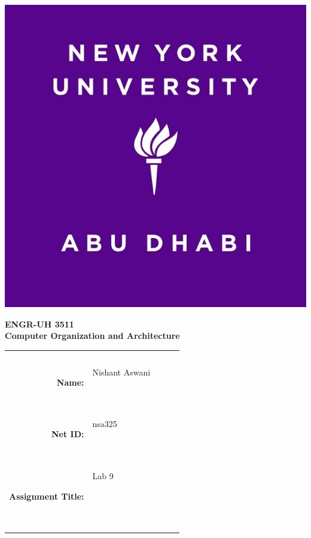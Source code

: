 \documentclass[twocolumn]{article}
\title{\myassignmenttitle}
\author{\myname, \myemail}
\affil{\myclassname (\mycoursenumber), Instructor \myinstructor}
\date{}
\newcommand{\myname}{Nishant Aswani}
\newcommand{\mynetid}{nsa325}
\newcommand{\myhwtype}{Lab }
\newcommand{\myhwnum}{9}
\newcommand{\mycoursenumber}{ENGR-UH 3511}
\newcommand{\myclassname}{Computer Organization and Architecture}
\begin{document}
\onecolumn
\pagestyle{fancy}
\fancyhf{}
\renewcommand{\headrulewidth}{0pt}

\begin{center}
  \includegraphics[scale=0.15]{etc/NYUAD-alt-logo.jpg}
\end{center}

{\vspace{2.5em}}

\begin{center}
    \Huge{\textbf{\mycoursenumber}}\\
    {\vspace{0.5em}}
    \Huge{\textbf{\myclassname}}
\end{center}

{\vspace{10em}}

\begin{center}
  \begin{tabular}{|rp{5.0cm}lll|}
    \hline
    &  &  &  & \\
    &  &  &  & \\
    \Large{\textbf{Name:}} & \Large{\myname}
    
    \  &  &  & \\
    \Large{\textbf{Net ID:}} & \Large{\mynetid}
    
    \  &  &  & \\
    \Large{\textbf{Assignment Title:}} & \Large{\myhwtype \myhwnum}
    
    \
    
    \  &  &  & \\
    \hline
  \end{tabular}
\end{center}
\end{document}
